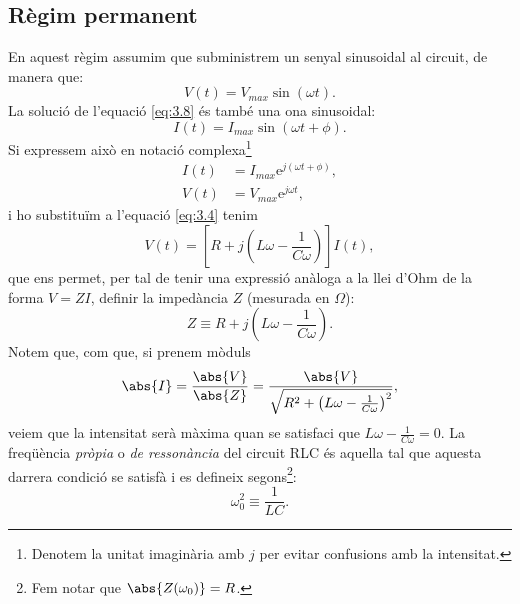 \documentclass[a4paper,10.5pt]{report}
\begin{document}
\subsection{Règim permanent}
En aquest règim assumim que subministrem un senyal sinusoidal al circuit, de manera que:
\begin{equation}
	V(t) = V_{max} \sin (\omega t). \label{eq:3.12}
\end{equation} 
La solució de l'equació \eqref{eq:3.8} és també una ona sinusoidal:
\begin{equation}
	I(t) = I_{max}\sin(\omega t + \phi).
\end{equation}
Si expressem això en notació complexa\footnote{Denotem la unitat imaginària amb $j$ per evitar confusions amb la intensitat.}
\begin{align}
	I(t) & = I_{max} \mathrm{e}^{j(\omega t + \phi)}, \\
	V(t) & = V_{max} \mathrm{e}^{j\omega t},
\end{align}
i ho substituïm a l'equació \eqref{eq:3.4} tenim
\begin{equation}
	V(t) = \left[R+j \left(L\omega - \frac{1}{C\omega}\right)\right]I(t),
\end{equation}
que ens permet, per tal de tenir una expressió anàloga a la llei d'Ohm de la forma $V=ZI$, definir la impedància $Z$ (mesurada en $\Omega$):
\begin{equation}
	Z \equiv R+j\left(L\omega - \frac{1}{C\omega}\right).
\end{equation}
Notem que, com que, si prenem mòduls
\begin{equation}
	\abs{I} = \frac{\abs{V}}{\abs{Z}} = \frac{\abs{V}}{\sqrt{R^2+\left( L\omega - \frac{1}{C\omega}\right)^2 }},
\end{equation}
veiem que la intensitat serà màxima quan se satisfaci que $L\omega - \frac{1}{C\omega} = 0$. La freqüència \textit{pròpia} o \textit{de ressonància} del circuit RLC és aquella tal que aquesta darrera condició se satisfà i es defineix segons\footnote{Fem notar que $\abs{Z(\omega_0)} = R$.}:
\begin{equation}
	\omega_0^2 \equiv \frac{1}{LC} \label{eq:3.19}.
\end{equation}
\end{document}
